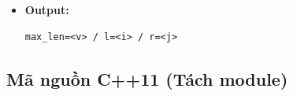 \begin{itemize}
\begin{itemize}
        \item \textbf{Module 3 (Ghi file):}
        \begin{itemize}
            \item Ghi:
\begin{lstlisting}
max_len=<v> / l=<i> / r=<j>
\end{lstlisting}
        \end{itemize}
    \end{itemize}

    \item \textbf{Output:}
\begin{lstlisting}
max_len=<v> / l=<i> / r=<j>
\end{lstlisting}
\end{itemize}

\subsection{Mã nguồn C++11 (Tách module)}
